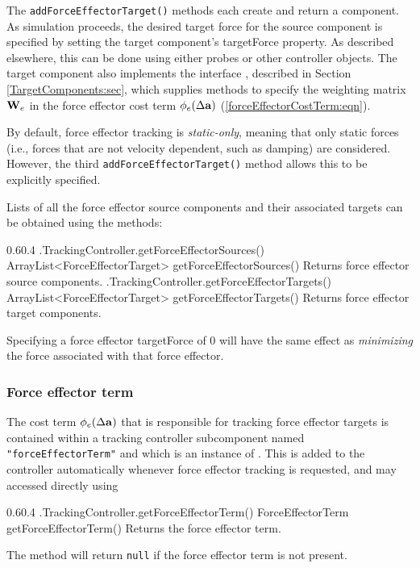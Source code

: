 The {\tt addForceEffectorTarget()} methods each create and return a
 component. 
As simulation proceeds, the desired target force for the source component is
specified by setting the target component's {\sf targetForce} property.  As
described elsewhere, this can be done using either probes or other controller
objects.  The target component also implements the interface
, described in
Section \ref{TargetComponents:sec}, which supplies methods to specify the
weighting matrix ${\bf W}_e$ in the force effector cost term $\phi_e(\Delta{\bf a})$
(\ref{forceEffectorCostTerm:eqn}).

By default, force effector tracking is {\it static-only}, meaning that only
static forces (i.e., forces that are not velocity dependent, such as damping)
are considered.  However, the third {\tt addForceEffectorTarget()} method
allows this to be explicitly specified.


Lists of all the force effector source components and their associated targets
can be obtained using the methods:
%
\begin{methodtable}{0.6}{0.4}
\midline
%
\methodentry
{\inverse.TrackingController.getForceEffectorSources()}%
{ArrayList<ForceEffectorTarget> getForceEffectorSources()}%
{Returns force effector source components.}%
%
\methodentry
{\inverse.TrackingController.getForceEffectorTargets()}%
{ArrayList<ForceEffectorTarget> getForceEffectorTargets()}%
{Returns force effector target components.}%
%
\midline
\end{methodtable}
%

\begin{sideblock}
Specifying a force effector {\sf targetForce} of 0 will have the
same effect as {\it minimizing} the force associated with that force effector.
\end{sideblock}

\subsubsection{Force effector term}
\label{ForceEffectorTerm:sec}

The cost term $\phi_e(\Delta{\bf a})$ that is responsible for tracking force effector
targets is contained within a tracking controller subcomponent named
{\tt "forceEffectorTerm"} and which is an instance of
. 
This is added to the controller automatically whenever force effector tracking
is requested, and may accessed directly using
%
\begin{methodtable}{0.6}{0.4}
\midline
%
\methodentry
{\inverse.TrackingController.getForceEffectorTerm()}%
{ForceEffectorTerm getForceEffectorTerm()}%
{Returns the force effector term.}%
%
\midline
\end{methodtable}
%
The method will return {\tt null} if the force effector term is not present.

